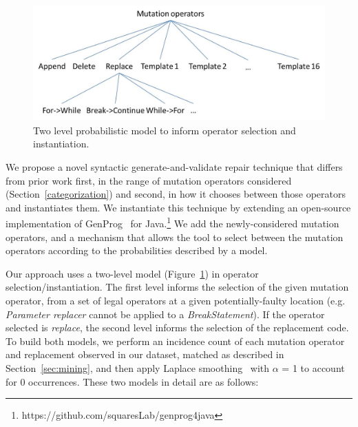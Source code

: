 \documentclass[conference]{IEEEtran}
\begin{document}
\begin{figure}[!h]
 \centering
    \includegraphics[width=\columnwidth]{Picture2}
  \caption{Two level probabilistic model to inform operator selection and instantiation. \label{fig:probModel}}
\end{figure}

We propose a novel syntactic generate-and-validate repair
technique that differs
from prior work first, in the range of mutation operators considered
(Section~\ref{categorization}) and second, in how it chooses between those
operators and instantiates them.  
We instantiate this technique by extending an open-source implementation of
GenProg~\cite{legoues12} for Java.\footnote{https://github.com/squaresLab/genprog4java}  We add the newly-considered mutation
operators, and a mechanism that allows the tool to
select between the mutation operators according to the probabilities described by
a model.


Our approach uses a two-level model (Figure~\ref{fig:probModel}) in operator
selection/instantiation.  The first level informs the selection of the given
mutation operator, from a set of legal operators at a given potentially-faulty
location (e.g. \emph{Parameter replacer} cannot be applied to a
\emph{BreakStatement}).  If the operator selected is \emph{replace}, the second
level informs the selection of the replacement code.  
To build both models, we perform an incidence count of each mutation operator
and replacement observed in our 
dataset, matched as described in Section~\ref{sec:mining},
and then apply Laplace smoothing~\cite{Russell10} with $\alpha$ = 1 to account
for 0 occurrences.  These two models in detail are as follows: 
\end{document}
